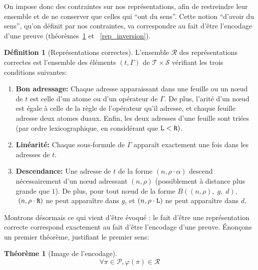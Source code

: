\documentclass[11pt,a4paper]{article}
\theoremstyle{plain}
\newtheorem{theorem}{Théorème}
\theoremstyle{definition}
\newtheorem{definition}{Définition}
\theoremstyle{remark}
\newcommand*{\someadd}{\rho}
\newcommand*{\someproof}{\pi}
\newcommand*{\sequent}{\Gamma}
\newcommand*{\Left}{\textnormal{\texttt{L}}}
\newcommand*{\Right}{\textnormal{\texttt{R}}}
\newcommand*{\proofs}{\ensuremath{\mathcal{P}}}
\newcommand*{\sequents}{\ensuremath{\mathcal{S}}}
\newcommand*{\trees}{\ensuremath{\mathcal{T}}}
\newcommand*{\representationslarge}{\ensuremath{\trees \times \sequents}}
\newcommand*{\representations}{\ensuremath{\mathcal{R}}}
\newcommand*{\encode}{\ensuremath{\varphi}}
\begin{document}
On impose donc des contraintes sur nos représentations, afin de restreindre leur ensemble et de ne conserver que celles qui ``ont du sens''. Cette notion ``d'avoir du sens'', qu'on définit par nos contraintes, va correspondre au fait d'être l'encodage d'une preuve (théorèmes~\ref{encode_img} et ~\ref{rep_inversion}).

\begin{definition}[Représentations correctes]
    \label{def_rep}
    L'ensemble \representations{} des représentations correctes est l'ensemble des éléments $(t, \sequent)$ de $\representationslarge$ vérifiant les trois conditions suivantes:
    
    \begin{enumerate}
    \item\label{cadd} \textbf{Bon adressage:} Chaque adresse apparaissant dans une feuille ou un n\oe ud de $t$ est celle d'un atome ou d'un opérateur de $\sequent$. De plus, l'arité d'un n\oe ud est égale à celle de la règle de l'opérateur qu'il adresse, et chaque feuille adresse deux atomes duaux. Enfin, les deux adresses d'une feuille sont triées (par ordre lexicographique, en considérant que $\Left < \Right)$.
    \item\label{clin} \textbf{Linéarité:} Chaque sous-formule de $\sequent$ apparaît exactement une fois dans les adresses de $t$.
    \item\label{cdes} \textbf{Descendance:} Une adresse de $t$ de la forme $(n, \someadd \cdot \alpha)$ descend nécessairement d'un n\oe ud adressant $(n, \someadd)$ (possiblement à distance plus grande que $1$). De plus, pour tout n\oe ud de la forme $B((n, \someadd), \; g, \; d)$, $\; (n, \someadd \cdot \Right)$ ne peut apparaître dans $g$, et $(n, \someadd \cdot \Left)$ ne peut apparaître dans $d$.
    \end{enumerate}
\end{definition}

Montrons désormais ce qui vient d'être évoqué : le fait d'être une représentation correcte correspond exactement au fait d'être l'encodage d'une preuve. Énonçons un premier théorème, justifiant le premier sens:

\begin{theorem}[Image de l'encodage]
    \label{encode_img}
    \begin{equation*}
    \forall \someproof \in \proofs, \encode \left( \someproof \right) \in \representations
    \end{equation*}
\end{theorem}
\end{document}
